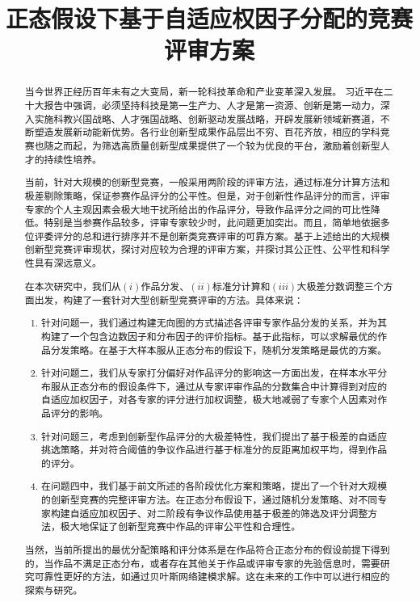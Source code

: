 \documentclass[bwprint]{gmcmthesis}
\title{正态假设下基于自适应权因子分配的竞赛评审方案}
\begin{document}
\newcommand\normf{}
 \maketitle


\begin{abstract}
当今世界正经历百年未有之大变局，新一轮科技革命和产业变革深入发展。
习近平在二十大报告中强调，必须坚持科技是第一生产力、人才是第一资源、创新是第一动力，深入实施科教兴国战略、人才强国战略、创新驱动发展战略，开辟发展新领域新赛道，不断塑造发展新动能新优势。各行业创新型成果作品层出不穷、百花齐放，相应的学科竞赛也随之而起，为筛选高质量创新型成果提供了一个较为优良的平台，激励着创新型人才的持续性培养。

当前，针对大规模的创新型竞赛，一般采用两阶段的评审方法，通过标准分计算方法和极差剔除策略，保证参赛作品评分的公平性。但是，对于创新性作品评分的而言，评审专家的个人主观因素会极大地干扰所给出的作品评分，导致作品评分之间的可比性降低。特别是当参赛作品较多，评审专家较少时，此问题更加突出。而且，简单地依据多位评委评分的总和进行排序并不是创新类竞赛评审的可靠方案。基于上述给出的大规模创新型竞赛评审现状，探讨对应较为合理的评审方案，并探讨其公正性、公平性和科学性具有深远意义。

在本次研究中，我们从$(i)$作品分发、$(ii)$标准分计算和$(iii)$大极差分数调整三个方面出发，构建了一套针对大型创新型竞赛评审的方法。具体来说：
\begin{enumerate}
\item 针对问题一，我们通过构建无向图的方式描述各评审专家作品分发的关系，并为其构建了一个包含边数因子和分布因子的评价指标。基于此指标，可以求解最优的作品分发策略。在基于大样本服从正态分布的假设下，随机分发策略是最优的方案。

\item 针对问题二，我们从专家打分偏好对作品评分的影响这一方面出发，在样本水平分布服从正态分布的假设条件下，通过从专家评审作品的分数集合中计算得到对应的自适应加权因子，对各专家的评分进行加权调整，极大地减弱了专家个人因素对作品评分的影响。

\item 针对问题三，考虑到创新型作品评分的大极差特性，我们提出了基于极差的自适应挑选策略，并对符合阈值的争议作品进行基于标准分的反距离加权平均，得到作品的评分。

\item 在问题四中，我们基于前文所述的各阶段优化方案和策略，提出了一个针对大规模的创新型竞赛的完整评审方法。在正态分布假设下，通过随机分发策略、对不同专家构建自适应加权因子、对二阶段有争议作品使用基于极差的筛选及评分调整方法，极大地保证了创新型竞赛中作品的评审公平性和合理性。
\end{enumerate}

当然，当前所提出的最优分配策略和评分体系是在作品符合正态分布的假设前提下得到的，当作品不满足正态分布，或者存在其他关于作品或评审专家的先验信息时，需要研究可靠性更好的方法，如通过贝叶斯网络建模求解。这在未来的工作中可以进行相应的探索与研究。

\end{abstract}
\end{document}

